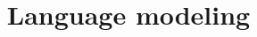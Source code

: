\documentclass{article}
\begin{document}
\title{Language modeling}
\author{}
\date{}
\maketitle
\end{document}
